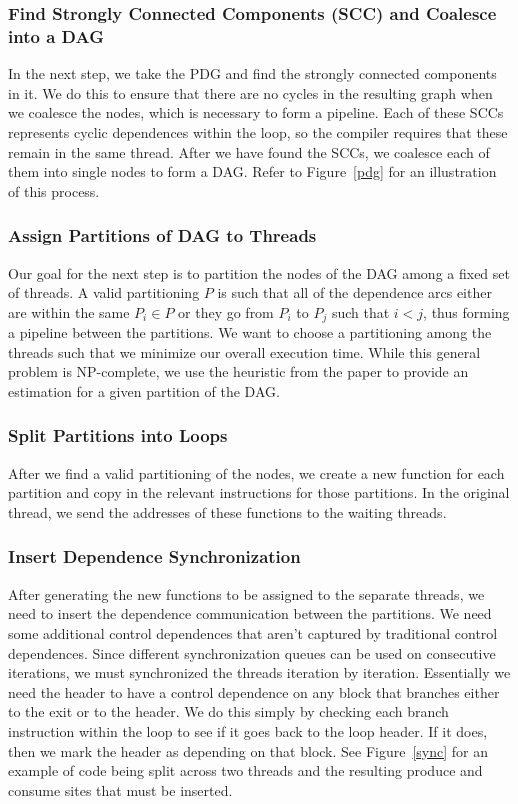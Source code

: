 \documentclass[11pt]{article}
\begin{document}
\subsubsection{Find Strongly Connected Components (SCC) and Coalesce into a DAG}
In the next step, we take the PDG and find the strongly connected components in it.  We do this to ensure that there are no cycles in the resulting graph when we coalesce the nodes, which is necessary to form a pipeline.  Each of these SCCs represents cyclic dependences within the loop, so the compiler requires that these remain in the same thread.  After we have found the SCCs, we coalesce each of them into single nodes to form a DAG.  Refer to Figure~\ref{pdg} for an illustration of this process.

\subsubsection{Assign Partitions of DAG to Threads}
Our goal for the next step is to partition the nodes of the DAG among a fixed set of threads.  A valid partitioning $P$ is such that all of the dependence arcs either are within the same $P_i \in P$ or they go from $P_i$ to $P_j$ such that $i < j$, thus forming a pipeline between the partitions.  We want to choose a partitioning among the threads such that we minimize our overall execution time.  While this general problem is NP-complete, we use the heuristic from the paper to provide an estimation for a given partition of the DAG.

\subsubsection{Split Partitions into Loops}
After we find a valid partitioning of the nodes, we create a new function for each partition and copy in the relevant instructions for those partitions.  In the original thread, we send the addresses of these functions to the waiting threads.

\subsubsection{Insert Dependence Synchronization}
After generating the new functions to be assigned to the separate threads, we need to insert the dependence communication between the partitions.  We need some additional control dependences that aren't captured by traditional control dependences.  Since different synchronization queues can be used on consecutive iterations, we must synchronized the threads iteration by iteration.  Essentially we need the header to have a control dependence on any block that branches either to the exit or to the header.  We do this simply by checking each branch instruction within the loop to see if it goes back to the loop header.  If it does, then we mark the header as depending on that block.  See Figure~\ref{sync} for an example of code being split across two threads and the resulting produce and consume sites that must be inserted.
\end{document}
